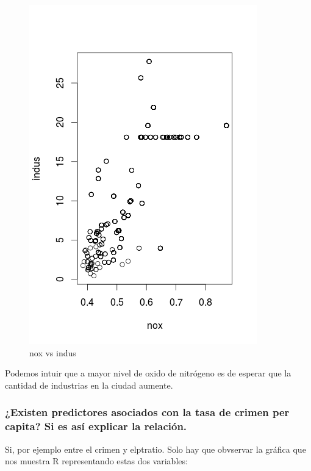 \begin{itemize}
\begin{figure}[H]
\centering
\includegraphics[scale=0.70]{noxvsindus.png}
\caption{nox vs indus}
\label{}
\end{figure}

Podemos intuir que a mayor nivel de oxido de nitrógeno es de esperar que la cantidad de industrias en la ciudad aumente.

\end{itemize}

\subsubsection{¿Existen predictores asociados con la tasa de crimen per capita? Si es así explicar la relación.}

Si, por ejemplo entre el crimen y elptratio. Solo hay que obvservar la gráfica que nos muestra R representando estas dos variables:


